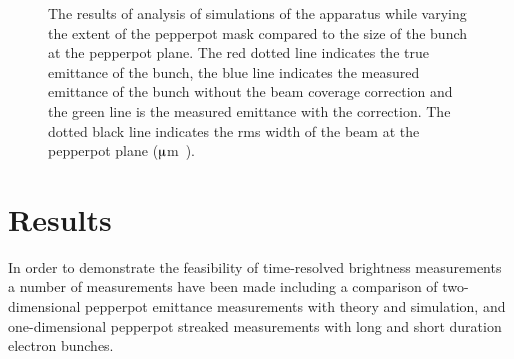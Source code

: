 \begin{figure}
    \center
    
    \caption[Results of a simulation investigating the efficacy of the beam coverage correction for various beam sizes.]{The results of analysis of simulations of the apparatus while varying the extent of the pepperpot mask compared to the size of the bunch at the pepperpot plane.
    The red dotted line indicates the true emittance of the bunch, the blue line indicates the measured emittance of the bunch without the beam coverage correction and the green line is the measured emittance with the correction.
    The dotted black line indicates the \gls{rms} width of the beam at the pepperpot plane (\unit[873]{$\muup$m}).}
    \label{figure:pepperpot_extent}
\end{figure}

\section{Results}
In order to demonstrate the feasibility of time-resolved brightness measurements a number of measurements have been made including a comparison of two-dimensional pepperpot emittance measurements with theory and simulation, and one-dimensional pepperpot streaked measurements with long and short duration electron bunches.

